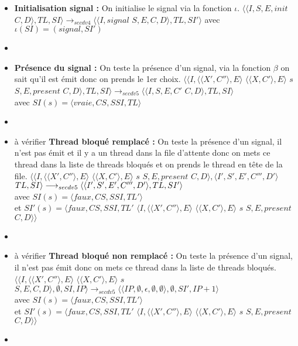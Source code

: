 \documentclass[10pt,a4paper]{article}
\begin{document}
\begin{enumerate}
\begin{itemize}
						\item[] \textbf{Initialisation signal :} On initialise le signal via la fonction $\iota$.
						\smallbreak 
						$\langle\langle I,S,E,init$ $C,D\rangle,TL,SI\rangle 
						\longrightarrow_{secdv4}
						\langle\langle I,signal$ $S,E,C,D\rangle,TL,SI'\rangle$
						avec $\iota(SI) = (signal,SI')$
						\item[]	
						
						\item[] \textbf{Présence du signal :} On teste la présence d'un signal, via la fonction $\beta$ on sait qu'il est émit donc on prends le 1er choix.
						\smallbreak
						$\langle\langle I,\langle\langle X',C''\rangle,E\rangle$ $\langle\langle X,C'\rangle,E\rangle$ $s$ $S,E,present$ $C,D\rangle,TL,SI\rangle 
						\longrightarrow_{secdv5} 
						\langle\langle I,S,E,C'$ $C,D\rangle,TL,SI\rangle$ 
						\\avec $SI(s) = \langle vraie,CS,SSI,TL\rangle$
						\item[]
						
						
						\item[] à vérifier\textbf{ Thread bloqué remplacé :} On teste la présence d'un signal, il n'est pas émit et il y a un thread dans la file d'attente
						donc on mets ce thread dans la liste de threads bloqués et on prends le thread en tête de la file.
						\smallbreak
						$\langle\langle I,\langle\langle X',C''\rangle,E\rangle$ $\langle\langle X,C'\rangle,E\rangle$ $s$ $S,E,present$ $C,D\rangle,\langle I',S',E',C''',D'\rangle$ $TL,SI\rangle 
						\\\longrightarrow_{secdv5} 
						\langle\langle I',S',E',C''',D'\rangle,TL,SI'\rangle$ 
						\\avec $SI(s) = \langle faux,CS,SSI,TL'\rangle$
						\\et $SI'(s) = \langle faux,CS,SSI,TL'$ $\langle I,\langle\langle X',C''\rangle,E\rangle$ $\langle\langle X,C'\rangle,E\rangle$ $s$ $S,E,present$ $C,D\rangle\rangle$
						\item[]	
						
						\item[] à vérifier \textbf{Thread bloqué non remplacé :} On teste la présence d'un signal, il n'est pas émit donc on mets ce thread dans la liste de threads bloqués.
						\smallbreak 
						$\langle\langle I,\langle\langle X',C''\rangle,E\rangle$ $\langle\langle X,C'\rangle,E\rangle$ $s$ $S,E,C,D\rangle,\emptyset,SI,IP\rangle 
						\longrightarrow_{secdv5} 
						\langle\langle IP,\emptyset,\epsilon,\emptyset,\emptyset\rangle,\emptyset,SI',IP+1\rangle$
						\\avec $SI(s) = \langle faux,CS,SSI,TL'\rangle$
						\\et $SI'(s) = \langle faux,CS,SSI,TL'$ $\langle I,\langle\langle X',C''\rangle,E\rangle$ $\langle\langle X,C'\rangle,E\rangle$ $s$ $S,E,present$ $C,D\rangle\rangle$
						\item[]
						

\end{itemize}
\end{enumerate}
\end{document}
